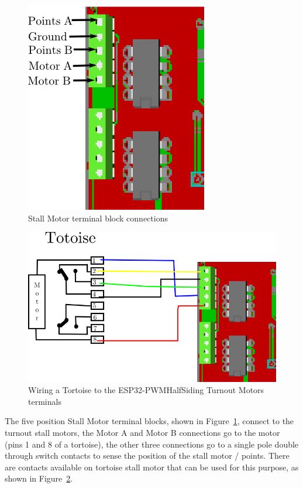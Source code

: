 \begin{figure}[hbpt]\begin{centering}%
\includegraphics{ESP32-PWMHalfSidingTurnoutMotorsFig.png}
\caption{Stall Motor terminal block connections}
\label{fig:ESP32-PWMHalfSidingTurnoutMotorsFig}
\end{centering}\end{figure}
\begin{figure}[hbpt]\begin{centering}%
\includegraphics{ESP32-PWMHalfSidingTotoiseWiring.png}
\caption{Wiring a Tortoise to the ESP32-PWMHalfSiding Turnout Motors terminals}
\label{fig:ESP32-PWMHalfSidingTotoiseWiring}
\end{centering}\end{figure}
The five position Stall Motor terminal blocks, shown in 
Figure~\ref{fig:ESP32-PWMHalfSidingTurnoutMotorsFig}, connect to the turnout 
stall motors, the Motor A and Motor B connections go to the motor (pins 1 and 
8 of a tortoise), the other three connections go to a single pole double 
through switch contacts to sense the position of the stall motor / points. 
There are contacts available on tortoise stall motor that can be used for this 
purpose, as shown in Figure~\ref{fig:ESP32-PWMHalfSidingTotoiseWiring}.

